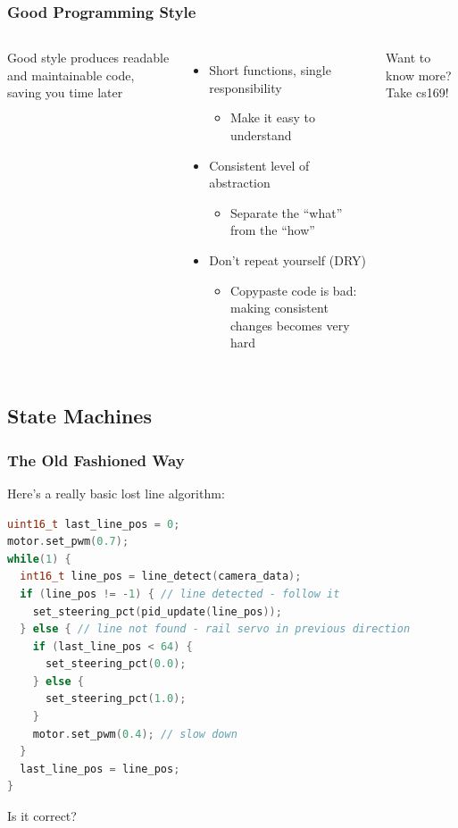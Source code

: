 \documentclass{beamer}
\begin{document}
\begin{frame}
\frametitle{Good Programming Style}
\begin{columns}[t]
Good style produces readable and maintainable code, saving you time later
\begin{itemize}
  \item Short functions, single responsibility
  \begin{itemize}
    \item Make it easy to understand
  \end{itemize}
  \item Consistent level of abstraction
  \begin{itemize}
    \item Separate the ``what'' from the ``how''
  \end{itemize}
  \item Don't repeat yourself (DRY)
  \begin{itemize}
    \item Copypaste code is bad: making consistent changes becomes very hard
  \end{itemize}
\end{itemize}
\vspace{5px}
Want to know more? Take cs169!


\end{columns}
\end{frame}

\subsection{State Machines}

\begin{frame}[fragile]
\frametitle{The Old Fashioned Way}
Here's a really basic lost line algorithm:
\vspace{2px}
\begin{lstlisting}[language=C++,basicstyle=\ttfamily\tiny]
uint16_t last_line_pos = 0;
motor.set_pwm(0.7);
while(1) {
  int16_t line_pos = line_detect(camera_data);
  if (line_pos != -1) { // line detected - follow it
    set_steering_pct(pid_update(line_pos));
  } else { // line not found - rail servo in previous direction
    if (last_line_pos < 64) {
      set_steering_pct(0.0);
    } else {
      set_steering_pct(1.0);
    }
    motor.set_pwm(0.4); // slow down
  }
  last_line_pos = line_pos;
}
\end{lstlisting}
\vspace{2px}
Is it correct?
\end{frame}
\end{document}
